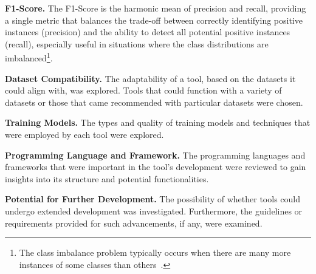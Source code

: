 \textbf{F1-Score.} The F1-Score is the harmonic mean of precision and recall, providing
a single metric that balances the trade-off between correctly identifying positive
instances (precision) and the ability to detect all potential positive instances (recall),
especially useful in situations where the class distributions are imbalanced\footnote{The class
	imbalance problem typically occurs when there are many more instances of some
	classes than others~\cite{JAVAHERI2014153}.}.

\textbf{Dataset Compatibility.} The adaptability of a tool, based on the datasets it
could align with, was explored. Tools that could function with a variety of datasets
or those that came recommended with particular datasets were chosen.

\textbf{Training Models.} The types and quality of training models and techniques that
were employed by each tool were explored.

\textbf{Programming Language and Framework.} The programming languages and frameworks
that were important in the tool's development were reviewed to gain insights into its
structure and potential functionalities.

\textbf{Potential for Further Development.} The possibility of whether tools could
undergo extended development was investigated. Furthermore, the guidelines or
requirements provided for such advancements, if any, were examined.

